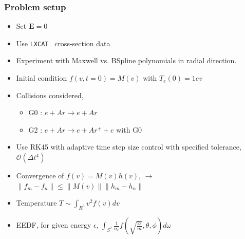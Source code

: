 \documentclass[mathserif, aspectratio=169]{beamer}
\newcommand{\vect}[1]{\boldsymbol{#1}}
\newcommand{\norm}[1]{\left\lVert#1\right\rVert}
\newcommand{\lxcat}{\texttt{LXCAT}}
\begin{document}
	\begin{frame}
		\frametitle{Problem setup}
		\begin{itemize}
			\item Set $\vect{E}=0$
			\item Use \lxcat~ cross-section data %
			\item Experiment with Maxwell vs. BSpline polynomials in radial direction. 
			\item Initial condition $f(v,t=0) = M(v)$ with $T_e(0)=1ev$ %
			\item Collisions considered, 
			\begin{itemize}
				\item G0 : $e + Ar \rightarrow e + Ar$
				\item G2 : $e + Ar \rightarrow e + Ar^+ + e$ with G0
			\end{itemize}
			\item Use RK45 with adaptive time step size control with specified tolerance, $\mathcal{O}(\Delta t ^4)$
			\item Convergence of $f(v) = M(v) h(v)$,  $\rightarrow$ $\norm{f_{m}- f_{n}} \leq \norm{M(v)} \norm{h_m-h_n}$
			\item Temperature $T \sim \int_{R^3} v^2 f(v) dv$
			\item EEDF, for given energy $\epsilon$, $\int_{S^2} \frac{1}{n_e} f(\sqrt{\frac{2\epsilon}{m}},\theta,\phi) d\omega$
		\end{itemize}
	\end{frame}
\end{document}
